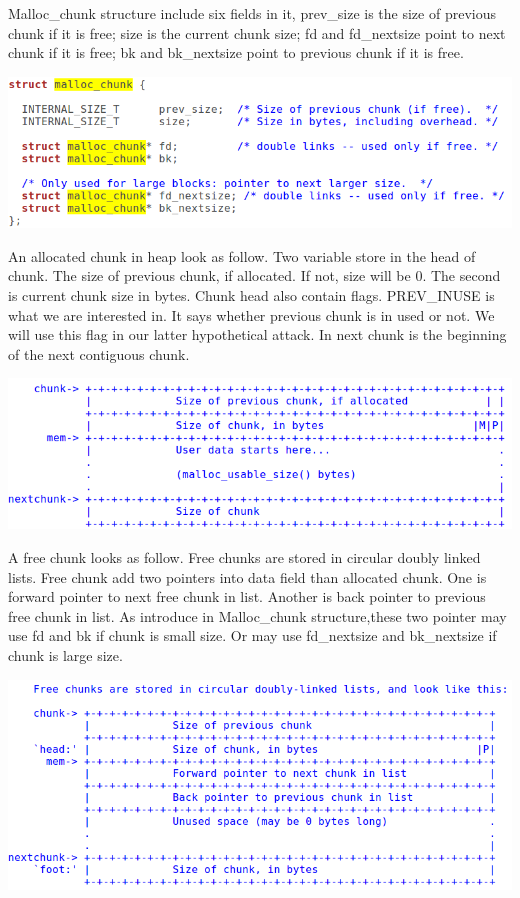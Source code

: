 \documentclass[12pt]{article}
\begin{document}
Malloc\_chunk structure include six fields in it, prev\_size is the size of previous chunk if it is free; size is the current chunk size; fd and fd\_nextsize point to next chunk if it is free; bk and bk\_nextsize point to previous chunk if it is free.   

\includegraphics[scale=0.4]{malloc_chunk_code.png}

An allocated chunk in heap look as follow. Two variable store in the head of chunk. The size of previous chunk, if allocated. If not, size will be 0. The second is current chunk size in bytes. Chunk head also contain flags. PREV\_INUSE is what we are interested in. It says whether previous chunk is in used or not. We will use this flag in our latter hypothetical attack. In next chunk is the beginning of the next contiguous chunk.  
 
\includegraphics[scale=0.5]{allocated_chunk.png}

A free chunk looks as follow. Free chunks are stored in circular doubly linked lists. Free chunk add two pointers into data field than allocated chunk. One is forward pointer to next free chunk in list. Another is back pointer to previous free chunk in list. As introduce in Malloc\_chunk structure,these two pointer may use fd and bk if chunk is small size. Or may use fd\_nextsize and bk\_nextsize if chunk is large size. 

\includegraphics[scale=0.5]{free_chunk.png}
\end{document}
